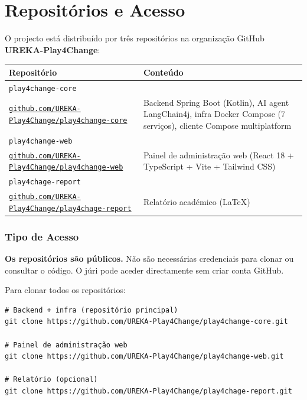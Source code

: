 \documentclass[12pt,a4paper]{article}
\begin{document}
\section{Repositórios e Acesso}

O projecto está distribuído por três repositórios na organização GitHub \textbf{UREKA-Play4Change}:

\begin{center}
\begin{tabularx}{\textwidth}{p{7.5cm}X}
\toprule
\textbf{Repositório} & \textbf{Conteúdo} \\
\midrule
\texttt{play4change-core}\\[0.4em]
\href{https://github.com/UREKA-Play4Change/play4change-core}{\footnotesize\texttt{github.com/UREKA-Play4Change/play4change-core}} &
  Backend Spring Boot (Kotlin), AI agent LangChain4j, infra Docker Compose (7 serviços), cliente Compose multiplatform \\[0.8em]
\texttt{play4change-web}\\[0.4em]
\href{https://github.com/UREKA-Play4Change/play4change-web}{\footnotesize\texttt{github.com/UREKA-Play4Change/play4change-web}} &
  Painel de administração web (React 18 + TypeScript + Vite + Tailwind CSS) \\[0.8em]
\texttt{play4chage-report}\\[0.4em]
\href{https://github.com/UREKA-Play4Change/play4chage-report}{\footnotesize\texttt{github.com/UREKA-Play4Change/play4chage-report}} &
  Relatório académico (LaTeX) \\
\bottomrule
\end{tabularx}
\end{center}

\subsubsection{Tipo de Acesso}

\begin{mdframed}[style=infobox]
\textbf{Os repositórios são públicos.} Não são necessárias credenciais para clonar ou consultar o código. O júri pode aceder directamente sem criar conta GitHub.
\end{mdframed}

Para clonar todos os repositórios:

\begin{lstlisting}[style=bash]
# Backend + infra (repositório principal)
git clone https://github.com/UREKA-Play4Change/play4change-core.git

# Painel de administração web
git clone https://github.com/UREKA-Play4Change/play4change-web.git

# Relatório (opcional)
git clone https://github.com/UREKA-Play4Change/play4chage-report.git
\end{lstlisting}
\end{document}
